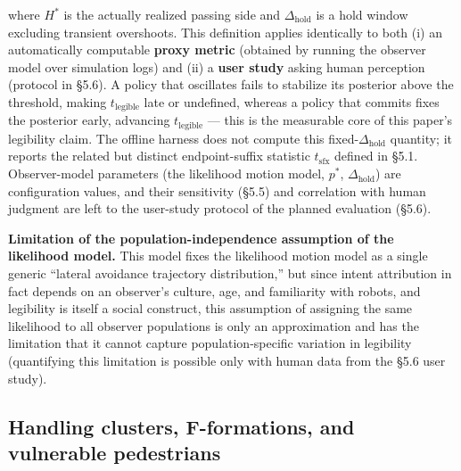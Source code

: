 \documentclass[11pt]{article}
\begin{document}
where $H^*$ is the actually realized passing side and $\Delta_{\text{hold}}$ is a hold window excluding transient overshoots. This definition applies identically to both (i) an automatically computable \textbf{proxy metric} (obtained by running the observer model over simulation logs) and (ii) a \textbf{user study} asking human perception (protocol in \S5.6). A policy that oscillates fails to stabilize its posterior above the threshold, making $t_{\text{legible}}$ late or undefined, whereas a policy that commits fixes the posterior early, advancing $t_{\text{legible}}$ --- this is the measurable core of this paper's legibility claim. The offline harness does not compute this fixed-$\Delta_{\text{hold}}$ quantity; it reports the related but distinct endpoint-suffix statistic $t_{\text{sfx}}$ defined in \S5.1. Observer-model parameters (the likelihood motion model, $p^*$, $\Delta_{\text{hold}}$) are configuration values, and their sensitivity (\S5.5) and correlation with human judgment are left to the user-study protocol of the planned evaluation (\S5.6).

\textbf{Limitation of the population-independence assumption of the likelihood model.} This model fixes the likelihood motion model as a single generic ``lateral avoidance trajectory distribution,'' but since intent attribution in fact depends on an observer's culture, age, and familiarity with robots, and legibility is itself a social construct, this assumption of assigning the same likelihood to all observer populations is only an approximation and has the limitation that it cannot capture population-specific variation in legibility (quantifying this limitation is possible only with human data from the \S5.6 user study).

\FloatBarrier
\subsection{Handling clusters, F-formations, and vulnerable pedestrians}
\end{document}
